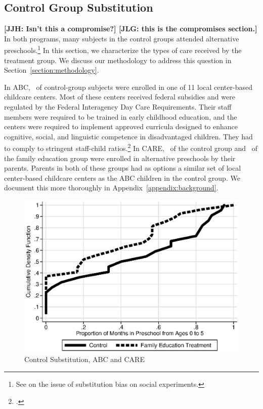 \subsection{Control Group Substitution}

\textbf{[JJH: Isn't this a compromise?] [JLG: this is the compromises section.]}
In both programs, many subjects in the control groups attended alternative preschools.\footnote{See \cite{Heckman_Hohmann_etal_2000_QJE} on the issue of substitution bias on social experiments.} In this section, we characterize the types of care received by the treatment group. We discuss our methodology to address this question in Section~\ref{section:methodology}.

In ABC, \treatsubsabc\ of control-group subjects were enrolled in one of 11 local center-based childcare centers. Most of these centers received federal subsidies and were regulated by the Federal Interagency Day Care Requirements. Their staff members were required to be trained in early childhood education, and the centers were required to implement approved curricula designed to enhance cognitive, social, and linguistic competence in disadvantaged children. They had to comply to stringent staff-child ratios.\footnote{\citet{Burchinal_etal_1989_CD_Daycare-Pre-K-Dev}.} In CARE, \treatsubscarec\ of the control group and \treatsubscaref\ of the family education group were enrolled in alternative preschools by their parents. Parents in both of these groups had as options a similar set of local center-based childcare centers as the ABC children in the control group. We document this more thoroughly in Appendix~\ref{appendix:background}.

\begin{figure}[H]
		\caption{Control Substitution, ABC and CARE} \label{fig:treatsubcare}
		\includegraphics[width=.9\columnwidth]{output/care_controlcontamination_months.eps}
\end{figure}

